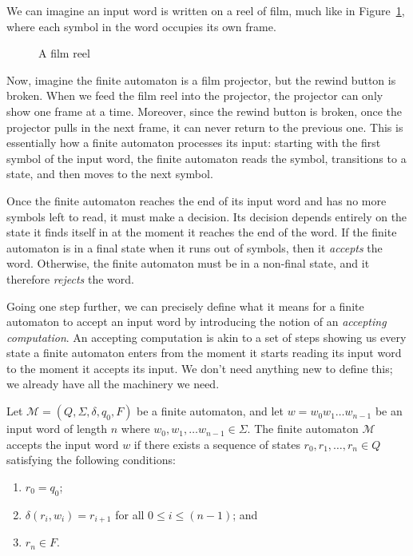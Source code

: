 We can imagine an input word is written on a reel of film, much like in Figure~\ref{fig:filmreel}, where each symbol in the word occupies its own frame.
\begin{figure}
\begin{center}
\end{center}
\caption{A film reel}
\label{fig:filmreel}
\end{figure}
Now, imagine the finite automaton is a film projector, but the rewind button is broken. When we feed the film reel into the projector, the projector can only show one frame at a time. Moreover, since the rewind button is broken, once the projector pulls in the next frame, it can never return to the previous one. This is essentially how a finite automaton processes its input: starting with the first symbol of the input word, the finite automaton reads the symbol, transitions to a state, and then moves to the next symbol.

Once the finite automaton reaches the end of its input word and has no more symbols left to read, it must make a decision. Its decision depends entirely on the state it finds itself in at the moment it reaches the end of the word. If the finite automaton is in a final state when it runs out of symbols, then it \emph{accepts} the word. Otherwise, the finite automaton must be in a non-final state, and it therefore \emph{rejects} the word.

Going one step further, we can precisely define what it means for a finite automaton to accept an input word by introducing the notion of an \emph{accepting computation}. An accepting computation is akin to a set of steps showing us every state a finite automaton enters from the moment it starts reading its input word to the moment it accepts its input. We don't need anything new to define this; we already have all the machinery we need.

\begin{definition}\label{def:computationdeterministic}
Let $\mathcal{M} = (Q, \Sigma, \delta, q_{0}, F)$ be a finite automaton, and let $w = w_{0}w_{1} \dots w_{n-1}$ be an input word of length $n$ where $w_{0}, w_{1}, \dots w_{n-1} \in \Sigma$. The finite automaton $\mathcal{M}$ accepts the input word $w$ if there exists a sequence of states $r_{0}, r_{1}, \dots, r_{n} \in Q$ satisfying the following conditions:
\begin{enumerate}
\item $r_{0} = q_{0}$;
\item $\delta(r_{i}, w_{i}) = r_{i+1}$ for all $0 \leq i \leq (n-1)$; and
\item $r_{n} \in F$.
\end{enumerate}
\end{definition}

